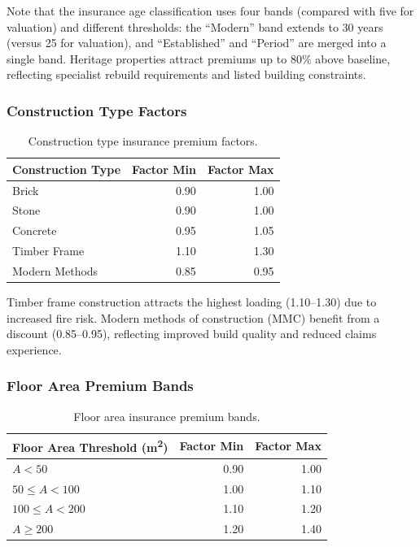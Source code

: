 \documentclass[11pt,a4paper]{article}
\begin{document}
\noindent Note that the insurance age classification uses four bands
(compared with five for valuation) and different thresholds: the
``Modern'' band extends to 30 years (versus 25 for valuation), and
``Established'' and ``Period'' are merged into a single band. Heritage
properties attract premiums up to 80\% above baseline, reflecting
specialist rebuild requirements and listed building constraints.

\subsubsection{Construction Type Factors}

\begin{table}[H]
\centering
\caption{Construction type insurance premium factors.}
\label{tab:construction_type}
\begin{tabular}{lrr}
\toprule
\textbf{Construction Type} & \textbf{Factor Min} & \textbf{Factor Max} \\
\midrule
Brick            & 0.90 & 1.00 \\
Stone            & 0.90 & 1.00 \\
Concrete         & 0.95 & 1.05 \\
Timber Frame     & 1.10 & 1.30 \\
Modern Methods   & 0.85 & 0.95 \\
\bottomrule
\end{tabular}
\end{table}

\noindent Timber frame construction attracts the highest loading
(1.10--1.30) due to increased fire risk. Modern methods of construction
(MMC) benefit from a discount (0.85--0.95), reflecting improved build
quality and reduced claims experience.

\subsubsection{Floor Area Premium Bands}

\begin{table}[H]
\centering
\caption{Floor area insurance premium bands.}
\label{tab:area_premium}
\begin{tabular}{lrr}
\toprule
\textbf{Floor Area Threshold (m\textsuperscript{2})} & \textbf{Factor Min} & \textbf{Factor Max} \\
\midrule
$A < 50$       & 0.90 & 1.00 \\
$50 \leq A < 100$  & 1.00 & 1.10 \\
$100 \leq A < 200$ & 1.10 & 1.20 \\
$A \geq 200$       & 1.20 & 1.40 \\
\bottomrule
\end{tabular}
\end{table}
\end{document}
